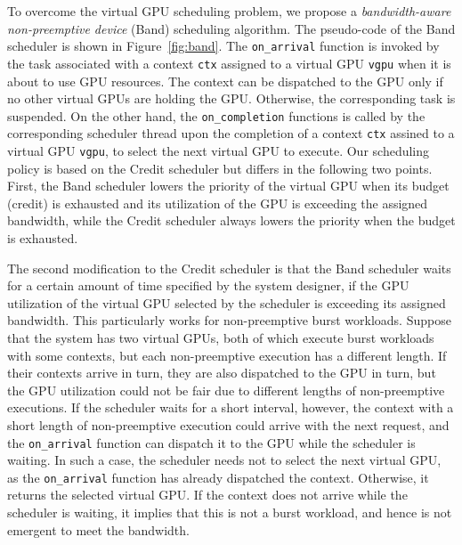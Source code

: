 To overcome the virtual GPU scheduling problem, we propose a
\textit{bandwidth-aware non-preemptive device} (Band) scheduling
algorithm.
The pseudo-code of the Band scheduler is shown in
Figure~\ref{fig:band}.
The \texttt{on\_arrival} function is invoked by the task associated with
a context \texttt{ctx} assigned to a virtual GPU \texttt{vgpu} when
it is about to use GPU resources.
The context can be dispatched to the GPU only if no other virtual GPUs
are holding the GPU.
Otherwise, the corresponding task is suspended.
On the other hand, the \texttt{on\_completion} functions is called by
the corresponding scheduler thread upon the completion of a context
\texttt{ctx} assined to a virtual GPU \texttt{vgpu}, to select the next
virtual GPU to execute. 
Our scheduling policy is based on the Credit scheduler but differs in
the following two points.
First, the Band scheduler lowers the priority of the virtual GPU when
its budget (credit) is exhausted and its utilization of the GPU is
exceeding the assigned bandwidth, while the Credit scheduler always
lowers the priority when the budget is exhausted.

The second modification to the Credit scheduler is that the Band
scheduler waits for a certain amount of time specified by the system
designer, if the GPU utilization of the virtual GPU selected
by the scheduler is exceeding its assigned bandwidth.
This particularly works for non-preemptive burst workloads.
Suppose that the system has two virtual GPUs, both of which execute
burst workloads with some contexts, but each non-preemptive execution
has a different length.
If their contexts arrive in turn, they are also dispatched to the GPU in
turn, but the GPU utilization could not be fair due to different lengths
of non-preemptive executions.
If the scheduler waits for a short interval, however, the context with a
short length of non-preemptive execution could arrive with the next
request, and the \texttt{on\_arrival} function can dispatch it to the
GPU while the scheduler is waiting.
In such a case, the scheduler needs not to select the next virtual
GPU, as the \texttt{on\_arrival} function has already dispatched the
context.
Otherwise, it returns the selected virtual GPU.
If the context does not arrive while the scheduler is waiting, it
implies that this is not a burst workload, and hence is not emergent to
meet the bandwidth.
